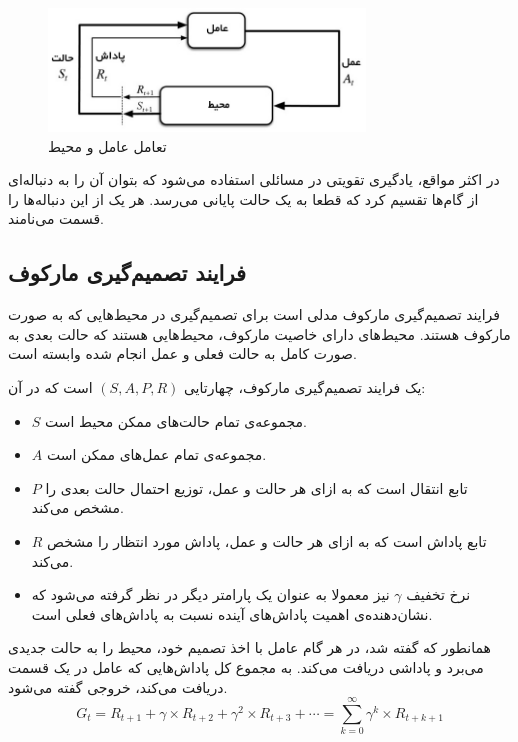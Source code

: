 \begin{figure}[H]
    \centering
    \includegraphics[width=0.75\textwidth]{images/agent_env.jpg}
    \caption{تعامل عامل و محیط}\label{fig:agent_env}

\end{figure}
در اکثر مواقع، یادگیری تقویتی در مسائلی استفاده می‌شود که بتوان آن را به دنباله‌ای از گام‌ها تقسیم کرد که قطعا به یک حالت پایانی می‌رسد.
 هر یک از این دنباله‌ها را قسمت
  می‌نامند.
\subsection{فرایند تصمیم‌گیری مارکوف}
فرایند تصمیم‌گیری مارکوف
  مدلی است برای تصمیم‌گیری در محیط‌هایی که به صورت مارکوف هستند.
  محیط‌های دارای خاصیت مارکوف، محیط‌هایی هستند که حالت بعدی به صورت کامل به حالت فعلی و عمل انجام شده وابسته است.


  یک فرایند تصمیم‌گیری مارکوف، چهارتایی 
  $(S, A, P, R)$
  است که در آن:
  \begin{itemize}
      \item $S$ مجموعه‌ی تمام حالت‌های ممکن محیط است.
      \item $A$ مجموعه‌ی تمام عمل‌های ممکن است.
      \item $P$ تابع انتقال
      است که به ازای هر حالت و عمل، توزیع احتمال حالت بعدی را مشخص می‌کند.
      \item $R$ تابع پاداش
      است که به ازای هر حالت و عمل، پاداش مورد انتظار را مشخص می‌کند.
      \item نرخ تخفیف $\gamma$ نیز معمولا به عنوان یک پارامتر دیگر در نظر گرفته می‌شود که نشان‌دهنده‌ی اهمیت پاداش‌های آینده نسبت به پاداش‌های فعلی است.
  \end{itemize}
همانطور که گفته شد، در هر گام عامل با اخذ تصمیم خود، محیط را به حالت جدیدی می‌برد و پاداشی دریافت می‌کند.
به مجموع کل پاداش‌هایی که عامل در یک قسمت دریافت می‌کند، خروجی
 گفته می‌شود.
 \begin{equation}\label{eq:return}
     G_t = R_{t+1} + \gamma \times R_{t+2} + \gamma^2 \times R_{t+3} + \cdots = \sum_{k=0}^\infty \gamma^k \times R_{t+k+1}
 \end{equation}
